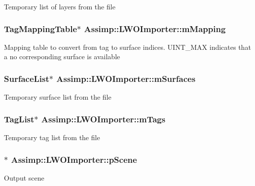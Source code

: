 Temporary list of layers from the file \hypertarget{class_assimp_1_1_l_w_o_importer_a53e4d9054d066d95cce5298e27ba0e68}{
\subsubsection[{m\+Mapping}]{\setlength{\rightskip}{0pt plus 5cm}Tag\+Mapping\+Table$\ast$ Assimp\+::\+L\+W\+O\+Importer\+::m\+Mapping\hspace{0.3cm}{\ttfamily [protected]}}}\label{class_assimp_1_1_l_w_o_importer_a53e4d9054d066d95cce5298e27ba0e68}
Mapping table to convert from tag to surface indices. U\+I\+N\+T\+\_\+\+M\+A\+X indicates that a no corresponding surface is available \hypertarget{class_assimp_1_1_l_w_o_importer_a6afb05a63b747556808f428455a9b812}{
\subsubsection[{m\+Surfaces}]{\setlength{\rightskip}{0pt plus 5cm}Surface\+List$\ast$ Assimp\+::\+L\+W\+O\+Importer\+::m\+Surfaces\hspace{0.3cm}{\ttfamily [protected]}}}\label{class_assimp_1_1_l_w_o_importer_a6afb05a63b747556808f428455a9b812}
Temporary surface list from the file \hypertarget{class_assimp_1_1_l_w_o_importer_a7c789687d870766d0fbe48d048a13b38}{
\subsubsection[{m\+Tags}]{\setlength{\rightskip}{0pt plus 5cm}Tag\+List$\ast$ Assimp\+::\+L\+W\+O\+Importer\+::m\+Tags\hspace{0.3cm}{\ttfamily [protected]}}}\label{class_assimp_1_1_l_w_o_importer_a7c789687d870766d0fbe48d048a13b38}
Temporary tag list from the file \hypertarget{class_assimp_1_1_l_w_o_importer_a3d95e70dd9a82a809f3d4d97df2e6d46}{
\subsubsection[{p\+Scene}]{$\ast$ Assimp\+::\+L\+W\+O\+Importer\+::p\+Scene\hspace{0.3cm}{\ttfamily [protected]}}}\label{class_assimp_1_1_l_w_o_importer_a3d95e70dd9a82a809f3d4d97df2e6d46}
Output scene 

